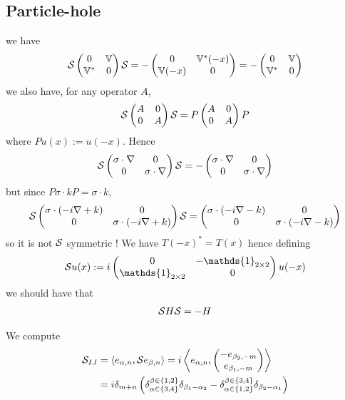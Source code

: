 \documentclass[11pt,a4paper,reqno,french,tikz]{amsart}
\newcommand{\pa}[1]{\left( #1 \right)} %
\newcommand{\acs}[1]{\left\{ #1 \right\}} %
\newcommand{\ps}[1]{\left< #1 \right>} %
\newcommand{\na}{\nabla} %
\newcommand{\mat}[1]{\begin{pmatrix} #1 \end{pmatrix}} %
\def\1{{\mathds{1}}}
\newcommand{\bbV}{\mathbb{V}}
\def\bbV{{\mathbb V}}
\def\1{{\mathds{1}}}
\begin{document}
\subsection{Particle-hole}%
\label{sub:particle_hole}

we have
\begin{align*}
\cS \mat{0 & \bbV \\ \bbV^* & 0} \cS = -\mat{0 & \bbV^*(-x) \\ \bbV(-x) & 0} = - \mat{0 & \bbV \\ \bbV^* & 0}
\end{align*}
we also have, for any operator $A$,
\begin{align*}
	\cS \mat{A & 0 \\ 0 & A} \cS = P \mat{A & 0 \\ 0 & A} P
\end{align*}
where $Pu(x) := u(-x)$. Hence
\begin{align*}
	\cS \mat{\sigma \cdot \na & 0 \\ 0 & \sigma \cdot \na} \cS = - \mat{\sigma \cdot \na & 0 \\ 0 & \sigma \cdot \na}
\end{align*}
but since $P \sigma \cdot k P = \sigma \cdot k$, 
\begin{align*}
	\cS \mat{\sigma \cdot \pa{-i\na + k} & 0 \\ 0 & \sigma \cdot \pa{-i\na + k}} \cS = \mat{\sigma \cdot \pa{-i\na -k} & 0 \\ 0 & \sigma \cdot \pa{-i\na -k}} 
\end{align*}
so it is not $\mathcal{S}$ symmetric ! We have $T(-x)^* = T(x)$ hence defining
\begin{align*}
\cS u(x) := i \mat{0 & -\1_{2\times 2} \\ \1_{2\times 2} & 0} u(-x)
\end{align*}
we should have that
\begin{align*}
\mathcal{S} H \mathcal{S} = - H
\end{align*}

We compute
\begin{align*}
	\cS_{IJ} &= \ps{e_{\alpha,n},\cS e_{\beta,n}} = i \ps{e_{\alpha,n}, \mat{-e_{\beta_2,-m} \\ e_{\beta_1,-m}}} \\
&= i \delta_{m+n} \pa{\delta_{\alpha \in \acs{3,4}}^{\beta \in \acs{1,2}} \delta_{\beta_1-\alpha_2} -\delta_{\alpha \in \acs{1,2}}^{\beta \in \acs{3,4}}\delta_{\beta_2-\alpha_1}}
\end{align*}
\end{document}
